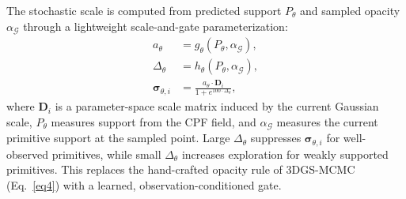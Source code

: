 \documentclass[lettersize,journal]{IEEEtran}
\begin{document}
The stochastic scale is computed from predicted support $P_{\theta}$ and sampled opacity $\alpha_{\mathcal{G}}$ through a lightweight scale-and-gate parameterization:
\begin{align}
    a_{\theta} &= g_{\theta}\left(P_{\theta}, \alpha_{\mathcal{G}}\right), \\
    \Delta_{\theta} &= h_{\theta}\left(P_{\theta}, \alpha_{\mathcal{G}}\right), \\
    \boldsymbol{\sigma}_{\theta,i} &= \frac{a_{\theta} \cdot \mathbf{D}_i}{1 + e^{100 \cdot \Delta_{\theta}}}, 
    \label{eq25}
\end{align}
where $\mathbf{D}_i$ is a parameter-space scale matrix induced by the current Gaussian scale, $P_{\theta}$ measures support from the CPF field, and $\alpha_{\mathcal{G}}$ measures the current primitive support at the sampled point.
Large $\Delta_{\theta}$ suppresses $\boldsymbol{\sigma}_{\theta,i}$ for well-observed primitives, while small $\Delta_{\theta}$ increases exploration for weakly supported primitives. This replaces the hand-crafted opacity rule of 3DGS-MCMC~\cite{mcmc} (Eq.~\ref{eq4}) with a learned, observation-conditioned gate.
\end{document}

